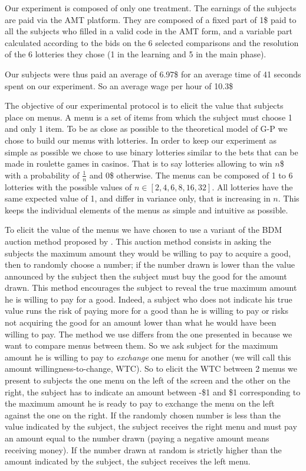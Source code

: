 \documentclass[
]{book}
\begin{document}
Our experiment is composed of only one treatment.
The earnings of the subjects are paid via the AMT platform.
They are composed of a fixed part of 1\$ paid to all the subjects who filled in
a valid code in the AMT form, and a variable part calculated according to the bids on the 6 selected
comparisons and the resolution of the 6 lotteries they chose (1 in the learning
and 5 in the main phase).

Our subjects were thus paid an average of 6.97\$ for
an average time of 41 seconds spent on our experiment.
So an average wage per hour of
10.3\$

The objective of our experimental protocol is to elicit the value that subjects
place on menus.
A menu is a set of items from which the subject must choose 1 and only 1 item.
To be as close as possible to the theoretical model of G-P we chose to build our
menus with lotteries.
In order to keep our experiment as simple as possible we chose to use binary
lotteries similar to the bets that can be made in roulette games in casinos.
That is to say lotteries allowing to win \(n\)\$ with a probability of \(\frac{1}{n}\)
and 0\$ otherwise.
The menus can be composed of 1 to 6 lotteries with the possible values of \(n \in [2, 4, 6, 8, 16, 32]\).
All lotteries have the same expected value of 1, and differ in variance only, that is increasing in \(n\). This keeps the individual elements of the menus as simple and intuitive as possible.

To elicit the value of the menus we have chosen to use a variant of the BDM auction
method proposed by \citet{becker1964measuring}.
This auction method consists in asking the subjects the maximum amount they
would be willing to pay to acquire a good, then to randomly choose a number;
if the number drawn is lower than the value announced by the subject then the
subject must buy the good for the amount drawn.
This method encourages the subject to reveal the true maximum amount he is willing to
pay for a good.
Indeed, a subject who does not indicate his true value runs the risk of paying
more for a good than he is willing to pay or risks not acquiring the good for an
amount lower than what he would have been willing to pay.
The method we use differs from the one presented in \citet{becker1964measuring} because
we want to compare menus between them.
So we ask subject for the maximum amount he is willing to pay to \emph{exchange} one
menu for another (we will call this amount willingness-to-change, WTC).
So to elicit the WTC between 2 menus we present to subjects the one menu on
the left of the screen and the other on the right, the subject has to indicate an amount
between -\$1 and \$1 corresponding to the maximum amount he is ready to pay to
exchange the menu on the left against the one on the right.
If the randomly chosen number is less than the value indicated by the subject,
the subject receives the right menu and must pay an amount equal to the number
drawn (paying a negative amount means receiving money).
If the number drawn at random is strictly higher than the amount indicated by
the subject, the subject receives the left menu.
\end{document}
